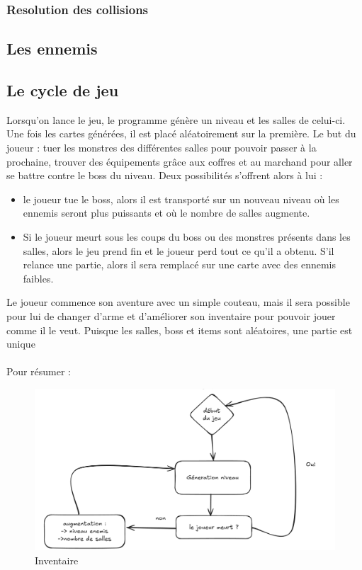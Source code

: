 \documentclass[a4paper,11pt]{article}
\begin{document}
\subsubsection{Resolution des collisions}

\subsection{Les ennemis}

\subsection{Le cycle de jeu}

Lorsqu'on lance le jeu, le programme génère un niveau et les salles de celui-ci. 
Une fois les cartes générées, il est placé aléatoirement sur la première. Le but du joueur : tuer les monstres des différentes salles pour pouvoir passer à la prochaine, 
trouver des équipements grâce aux coffres et au marchand pour aller se battre contre le boss du niveau. Deux possibilités s'offrent alors à lui :
\begin{itemize}
    \item le joueur tue le boss, alors il est transporté sur un nouveau niveau où les ennemis seront plus puissants et où le nombre de salles augmente.
    \item Si le joueur meurt sous les coups du boss ou des monstres présents dans les salles, alors le jeu prend fin et le joueur perd tout ce qu'il a obtenu. S'il relance une partie, alors il sera remplacé sur une carte avec des ennemis faibles.
\end{itemize}
Le joueur commence son aventure avec un simple couteau, mais il sera possible pour lui de changer d'arme et d'améliorer son inventaire pour pouvoir jouer comme il le veut. Puisque les salles, boss et items sont aléatoires, une partie est unique
\\\\
Pour résumer : 
\begin{figure}[ht] 
    \centering 
    \includegraphics[width=0.4\linewidth]{./img/scchemaCycleJeu.png} 
    \caption{Inventaire} 
\end{figure} 
\end{document}
